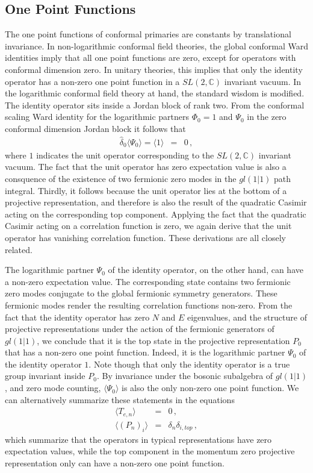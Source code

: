 \documentclass[12pt]{article}
\numberwithin{equation}{section}
\numberwithin{equation}{section}
\numberwithin{table}{section}\setlength{\multlinegap}{25pt}
\begin{document}
\subsection{One Point Functions}
The one point functions of conformal primaries are constants by translational invariance. In non-logarithmic
conformal field theories, the global conformal Ward identities imply that all one point functions are zero,
except for operators with conformal dimension zero. In unitary theories, this implies that only the identity
operator has a non-zero one point function in a $SL(2,\mathbb{C})$ invariant vacuum. In the logarithmic
conformal field theory at hand, the standard wisdom is modified. The identity operator
sits inside a Jordan block of rank two. From the conformal scaling Ward identity for the logarithmic partners
$\Phi_0=1$ and $\Psi_0$
in the zero conformal dimension Jordan block
it follows that
\begin{eqnarray}
\hat{\delta}_0 \langle \Psi_0 \rangle =  \langle 1 \rangle &=& 0 \, ,
\end{eqnarray}
where $1$ indicates the unit operator corresponding to the $SL(2,\mathbb{C})$
invariant vacuum. 
The fact that the unit operator has zero expectation value is also a consquence of the existence of two fermionic
zero modes in the $gl(1|1)$ path integral. Thirdly, it follows because the unit operator lies at the bottom
of a projective representation, and therefore is also the result of the quadratic Casimir acting on the corresponding top component.
Applying  the fact that the quadratic Casimir acting on a correlation function is zero, we again derive that the unit operator has
vanishing correlation function. These derivations are all closely related.

The logarithmic partner $\Psi_0$ of the identity operator, on the other hand, can have a non-zero expectation value. The corresponding state contains
two fermionic zero modes conjugate to the global fermionic symmetry generators. These
fermionic modes render the resulting correlation functions non-zero.
From the fact that the identity operator has zero $N$ and $E$ eigenvalues, and the structure of projective representations
under the action of the fermionic generators of $gl(1|1)$, we conclude that it is the top state
in the projective representation $P_0$ that has a non-zero one point function. Indeed, it is the logarithmic
partner $\Psi_0$ of the identity operator $1$. Note though that only the identity operator is a true group invariant inside $P_0$.
By invariance under the bosonic subalgebra of $gl(1|1)$, and zero mode counting, $\langle \Psi_0 \rangle$ 
is also the only non-zero one point function. We can alternatively
summarize these statements in the equations
\begin{eqnarray}
\langle T_{e,n} \rangle &=& 0 \, ,
\nonumber \\
\langle (P_n)_i \rangle &=& \delta_{n} \delta_{i,top} \, ,
\end{eqnarray}
which summarize that the operators in typical representations have zero expectation values, while the top component in the momentum zero
projective representation only can have a non-zero one point function.
\end{document}
